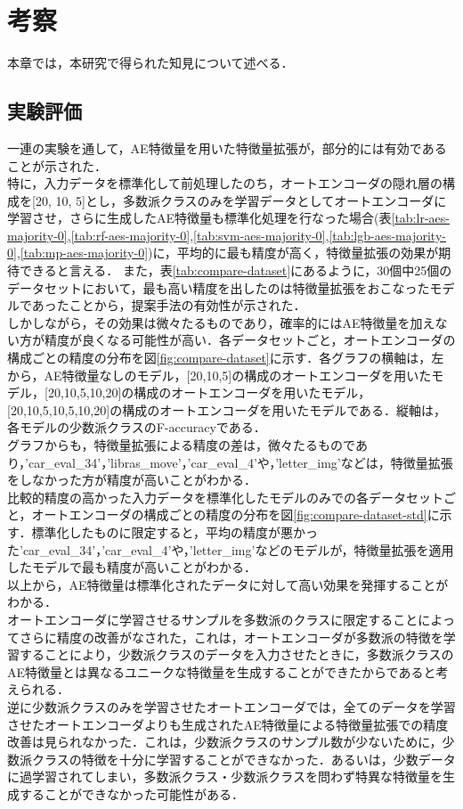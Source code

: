 \chapter{考察}
本章では，本研究で得られた知見について述べる．

\section{実験評価}
一連の実験を通して，AE特徴量を用いた特徴量拡張が，部分的には有効であることが示された．\\
特に，入力データを標準化して前処理したのち，オートエンコーダの隠れ層の構成を[20, 10, 5]とし，多数派クラスのみを学習データとしてオートエンコーダに学習させ，さらに生成したAE特徴量も標準化処理を行なった場合(表\ref{tab:lr-aes-majority-0},\ref{tab:rf-aes-majority-0},\ref{tab:svm-aes-majority-0},\ref{tab:lgb-aes-majority-0},\ref{tab:mp-aes-majority-0})に，平均的に最も精度が高く，特徴量拡張の効果が期待できると言える．
また，表\ref{tab:compare-dataset}にあるように，30個中25個のデータセットにおいて，最も高い精度を出したのは特徴量拡張をおこなったモデルであったことから，提案手法の有効性が示された．\\
しかしながら，その効果は微々たるものであり，確率的にはAE特徴量を加えない方が精度が良くなる可能性が高い．各データセットごと，オートエンコーダの構成ごとの精度の分布を図\ref{fig:compare-dataset}に示す．各グラフの横軸は，左から，AE特徴量なしのモデル，[20,10,5]の構成のオートエンコーダを用いたモデル，[20,10,5,10,20]の構成のオートエンコーダを用いたモデル，[20,10,5,10,5,10,20]の構成のオートエンコーダを用いたモデルである．縦軸は，各モデルの少数派クラスのF-accuracyである．\\
グラフからも，特徴量拡張による精度の差は，微々たるものであり，'car\_eval\_34'，'libras\_move'，'car\_eval\_4'や，'letter\_img'などは，特徴量拡張をしなかった方が精度が高いことがわかる．\\

比較的精度の高かった入力データを標準化したモデルのみでの各データセットごと，オートエンコーダの構成ごとの精度の分布を図\ref{fig:compare-dataset-std}に示す．標準化したものに限定すると，平均の精度が悪かった'car\_eval\_34'，'car\_eval\_4'や，'letter\_img'などのモデルが，特徴量拡張を適用したモデルで最も精度が高いことがわかる．\\
以上から，AE特徴量は標準化されたデータに対して高い効果を発揮することがわかる．\\

オートエンコーダに学習させるサンプルを多数派のクラスに限定することによってさらに精度の改善がなされた，これは，オートエンコーダが多数派の特徴を学習することにより，少数派クラスのデータを入力させたときに，多数派クラスのAE特徴量とは異なるユニークな特徴量を生成することができたからであると考えられる．\\
逆に少数派クラスのみを学習させたオートエンコーダでは，全てのデータを学習させたオートエンコーダよりも生成されたAE特徴量による特徴量拡張での精度改善は見られなかった．これは，少数派クラスのサンプル数が少ないために，少数派クラスの特徴を十分に学習することができなかった．あるいは，少数データに過学習されてしまい，多数派クラス・少数派クラスを問わず特異な特徴量を生成することができなかった可能性がある．\\

